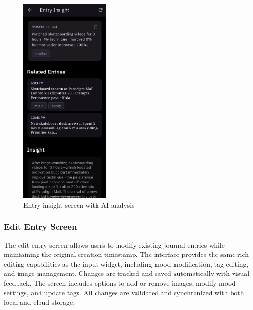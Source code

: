 \begin{figure}[H]
\centering
\includegraphics[width=0.4\textwidth]{files/imgs/prototype/entry_insight_screen.jpeg}
\caption{Entry insight screen with AI analysis}
\label{fig:entry-insight-screen}
\end{figure}

\subsubsection{Edit Entry Screen}

The edit entry screen allows users to modify existing journal entries while maintaining the original creation timestamp. The interface provides the same rich editing capabilities as the input widget, including mood modification, tag editing, and image management. Changes are tracked and saved automatically with visual feedback. The screen includes options to add or remove images, modify mood settings, and update tags. All changes are validated and synchronized with both local and cloud storage.


